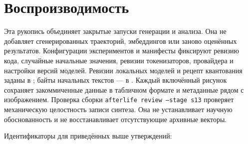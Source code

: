 \documentclass[10pt]{article}
\begin{document}
\section{Воспроизводимость}
\label{sec:repro}

Эта рукопись объединяет закрытые запуски генерации и анализа.
Она не добавляет сгенерированных траекторий, эмбеддингов
или заново оценённых результатов.
Конфигурации экспериментов и манифесты фиксируют ревизию кода,
случайные начальные значения, ревизии токенизаторов,
провайдера и настройки версий моделей.
Ревизии локальных моделей и рецепт квантования заданы в
\protect{};
байты начальных текстов --- в \protect{}.
Каждый включённый рисунок сохраняет закоммиченные данные
в табличном формате и метаданные рядом с изображением.
Проверка сборки \texttt{afterlife review --stage s13}
проверяет механическую целостность записи синтеза.
Она не устанавливает научную обоснованность
и не восстанавливает отсутствующие архивные векторы.

Идентификаторы для приведённых выше утверждений:
\end{document}
